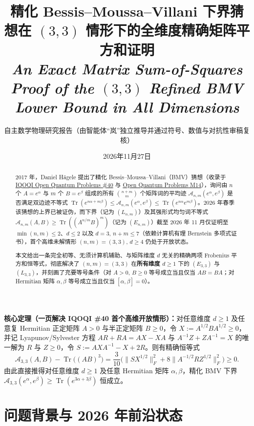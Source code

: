 \documentclass[11pt,a4paper]{article}
\title{\textbf{\color{primary}精化 Bessis--Moussa--Villani 下界猜想在 $(3,3)$ 情形下的全维度精确矩阵平方和证明}\\[4pt]
\large\textit{An Exact Matrix Sum-of-Squares Proof of the $(3,3)$ Refined BMV Lower Bound in All Dimensions}}
\author{自主数学物理研究报告（由智能体“岚”独立推导并通过符号、数值与对抗性审稿复核）}
\date{2026年11月27日}
\theoremstyle{remark}
\newcommand{\Tr}{\operatorname{Tr}}
\newcommand{\takeaway}[2]{%
  \vspace{6pt}\noindent\colorbox{primary!8}{%
    \parbox{\dimexpr\linewidth-2\fboxsep\relax}{%
      \vspace{4pt}\textbf{\color{primary}#1：}\hspace{0.4em}#2\vspace{4pt}%
    }%
  }\vspace{6pt}%
}
\begin{document}
\maketitle

\begin{abstract}
2017 年，Daniel H\"agele 提出了精化 Bessis--Moussa--Villani（BMV）猜想（收录于 \href{https://oqp.iqoqi.oeaw.ac.at/open-quantum-problems}{IQOQI Open Quantum Problems \#40} 与 \href{https://openquantumproblems.com/p/M14}{Open Quantum Problems M14}），询问由 $n$ 个 $A=e^\alpha$ 与 $m$ 个 $B=e^\beta$ 组成的所有 $\binom{n+m}{m}$ 个矩阵词的平均迹 $\mathcal{A}_{n,m}(e^\alpha, e^\beta)$ 是否满足双边迹不等式 $\Tr(e^{n\alpha+m\beta}) \le \mathcal{A}_{n,m}(e^\alpha, e^\beta) \le \Tr(e^{n\alpha}e^{m\beta})$。2026 年春季该猜想的上界已被证伪，而下界（记为 $(L_{n,m})$）及其强形式均匀词不等式 $\mathcal{A}_{n,m}(A,B)\ge \Tr((A^{n/m}B)^m)$（记为 $(E_{n,m})$）截至 2026 年 11 月仅证明至 $\min(n,m)\le 2$、$d\le 2$ 以及 $d=3,\,n+m\le 7$（依赖计算机有理 Bernstein 多项式证书），首个高维未解情形 $(n,m)=(3,3),\, d\ge 4$ 仍处于开放状态。

本文给出一条完全初等、无须计算机辅助、与矩阵维度 $d$ 无关的精确两项 Frobenius 平方和恒等式，彻底解决了 $(n,m)=(3,3)$ 在\textbf{所有维度 $d\ge 1$} 下的 $(E_{3,3})$ 与 $(L_{3,3})$，并刻画了充要等号条件（对 $A>0,\,B\ge 0$ 等号成立当且仅当 $AB=BA$；对 Hermitian 矩阵 $\alpha,\beta$ 等号成立当且仅当 $[\alpha,\beta]=0$）。
\end{abstract}

\takeaway{核心定理（一页解决 IQOQI \#40 首个高维开放情形）}{对任意维度 $d \ge 1$ 及任意复 Hermitian 正定矩阵 $A > 0$ 与半正定矩阵 $B \ge 0$，令 $X := A^{1/2}BA^{1/2} \ge 0$，并记 Lyapunov/Sylvester 方程 $AR + RA = AX - XA$ 与 $A^{-1}Z + ZA^{-1} = X$ 的唯一解为 $R$ 与 $Z \ge 0$，令 $S := AXA^{-1} - X + 2R$。则有精确恒等式
\[
\mathcal{A}_{3,3}(A,B) - \Tr\!\big((AB)^3\big) = \frac{3}{10}\Big(\big\|S X^{1/2}\big\|_F^2 + 8\big\|A^{-1/2} R Z^{1/2}\big\|_F^2\Big) \ge 0.
\]
由此直接推得对任意维度 $d\ge 1$ 及任意 Hermitian 矩阵 $\alpha,\beta$，精化 BMV 下界 $\mathcal{A}_{3,3}(e^\alpha, e^\beta) \ge \Tr(e^{3\alpha+3\beta})$ 恒成立。}

\section{问题背景与 2026 年前沿状态}
\end{document}
